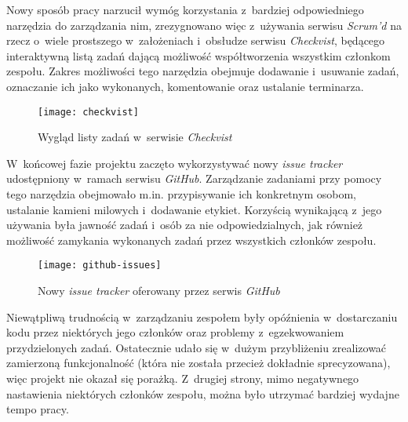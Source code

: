 Nowy sposób pracy narzucił wymóg korzystania z~bardziej odpowiedniego narzędzia do zarządzania nim, zrezygnowano więc z~używania serwisu \emph{Scrum'd} na rzecz o~wiele prostszego w~założeniach i~obsłudze serwisu \emph{Checkvist}, będącego
interaktywną listą zadań dającą możliwość współtworzenia wszystkim członkom zespołu. Zakres możliwości tego narzędzia obejmuje dodawanie i~usuwanie zadań, oznaczanie ich jako wykonanych, komentowanie oraz ustalanie terminarza.

\begin{figure}[ht]
	\centering
		\texttt{[image: checkvist]}
	\caption{Wygląd listy zadań w~serwisie \emph{Checkvist}}
	\label{fig:checkvist}
\end{figure}

W~końcowej fazie projektu zaczęto wykorzystywać nowy \emph{issue tracker} udostępniony w~ramach serwisu \emph{GitHub}. Zarządzanie zadaniami przy pomocy tego narzędzia obejmowało m.in. przypisywanie ich konkretnym osobom, ustalanie kamieni milowych i~dodawanie etykiet. Korzyścią wynikającą z~jego używania była jawność zadań i~osób za nie odpowiedzialnych, jak również możliwość zamykania wykonanych zadań przez wszystkich członków zespołu.

\begin{figure}[h!]
	\centering
		\texttt{[image: github-issues]}
	\caption{Nowy \emph{issue tracker} oferowany przez serwis \emph{GitHub}}
	\label{fig:github-issues}
\end{figure}

Niewątpliwą trudnością w~zarządzaniu zespołem były opóźnienia w~dostarczaniu kodu przez niektórych jego członków oraz problemy z~egzekwowaniem przydzielonych zadań. Ostatecznie udało się w~dużym przybliżeniu zrealizować zamierzoną funkcjonalność (która nie została przecież dokładnie sprecyzowana), więc projekt nie okazał się porażką. Z~drugiej strony, mimo negatywnego nastawienia niektórych członków zespołu, można było utrzymać bardziej wydajne tempo pracy.
